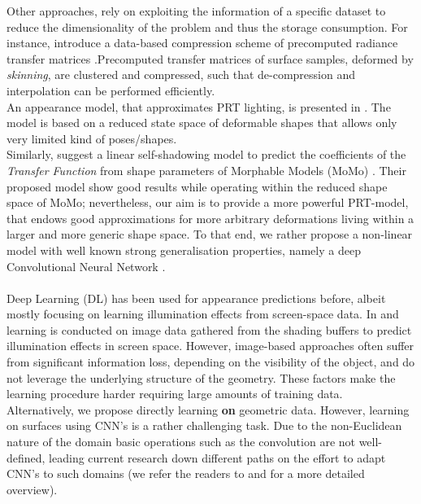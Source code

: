 Other approaches, rely on exploiting the information of a specific dataset to reduce the dimensionality of the problem and thus the storage consumption. For instance, \cite{SkinningPRT} introduce a data-based compression scheme of precomputed radiance transfer matrices .Precomputed transfer matrices of surface samples, deformed by \textit{skinning}, are clustered and compressed, such that de-compression and interpolation can be performed efficiently.
\\  
An appearance model, that approximates PRT lighting, is presented in  \cite{James_Fatahalian}. The model is based on a reduced state space of deformable shapes that allows only very limited kind of poses/shapes. 
\\
Similarly, \cite{MoMoPRT} suggest a linear self-shadowing model to predict the coefficients of the \textit{Transfer Function} from shape parameters of Morphable Models (MoMo) \cite{MoMo}. Their proposed model show good results while operating within the reduced shape space of MoMo; nevertheless, our aim is to provide a more powerful PRT-model, that endows good approximations for more arbitrary deformations living within a larger and more generic shape space. To that end, we rather propose a non-linear model with well known strong generalisation properties, namely a deep Convolutional Neural Network \cite{DL_nature, ImageNet_CNN, CNN_videoClassification}.  
\\
\\
Deep Learning (DL) has been used for appearance predictions before, albeit mostly focusing on learning illumination effects from screen-space data. In  \cite{Nalbach2017b} and \cite{DBLP} learning is conducted on image data gathered from the shading buffers to predict illumination effects in screen space. However, image-based approaches often suffer from significant information loss, depending on the visibility of the object, and do not leverage the underlying structure of the geometry. These factors make the learning procedure harder requiring large amounts of training data.
\\
Alternatively, we propose directly learning \textbf{on} geometric data.  However, learning on surfaces using CNN's is a rather challenging task. Due to the non-Euclidean nature of the domain basic operations such as the convolution are not well-defined, leading current research down different paths on the effort to adapt CNN's to such domains (we refer the readers to \cite{Geometric_deep_learning} and \cite{DeepGeoCourse} for a more detailed overview).
\\
